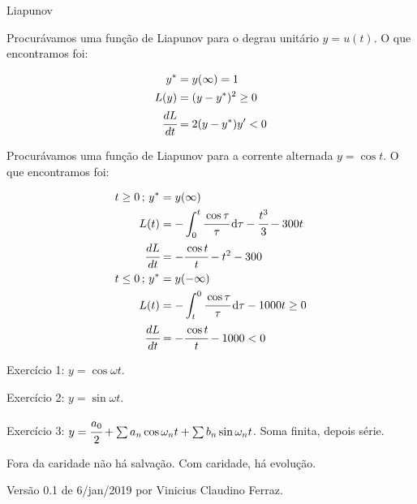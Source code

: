 \documentclass[12pt,a4paper]{article}
\begin{document}
\Large

Liapunov

\normalsize

\vspace{6mm}

Procur\'avamos uma fun\c{c}\~ao de Liapunov para o degrau unit\'ario $y = u(t)$. O que encontramos foi:

\begin{align}
y^* &= y(\infty) = 1 \\
L(y) &= (y - y^*)^2 \ge 0 \\
\cfrac{dL}{dt} &= 2 (y - y^*) y' < 0
\end{align}

\vspace{6mm}

Procur\'avamos uma fun\c{c}\~ao de Liapunov para a corrente alternada $y = \cos t$. O que encontramos foi:

\begin{align}
t \ge 0\,;\, y^* &= y(\infty) \\
L(t) &= - \int_0^t \cfrac{\cos \tau}{\tau} \,\mathrm{d}\tau - \cfrac{t^3}{3} - 300t \\
\cfrac{dL}{dt} &= - \cfrac{\cos t}{t} - t^2 - 300 \\
t \le 0\,;\, y^* &= y(-\infty) \\
L(t) &= - \int_t^0 \cfrac{\cos \tau}{\tau} \,\mathrm{d}\tau - 1000t \ge 0 \\
\cfrac{dL}{dt} &= - \cfrac{\cos t}{t} - 1000 < 0
\end{align}

\vspace{3mm}

Exerc\'icio 1: $y = \cos \omega t$.

\vspace{3mm}

Exerc\'icio 2: $y = \sin \omega t$.

\vspace{3mm}

Exerc\'icio 3: $y = \cfrac{a_0}{2} + \sum a_n \cos \omega_n t + \sum b_n \sin \omega_n t$. Soma finita, depois s\'erie.

\vspace{6mm}

Fora da caridade n\~ao h\'a salva\c{c}\~ao. Com caridade, h\'a evolu\c{c}\~ao.

\vspace{6mm}

Vers\~ao 0.1 de 6/jan/2019 por Vinicius Claudino Ferraz.
\end{document}
